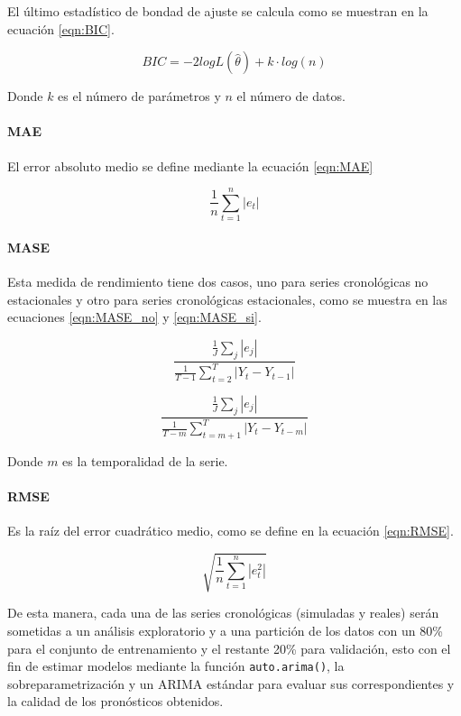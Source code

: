 \documentclass[
]{article}
\begin{document}
El último estadístico de bondad de ajuste se calcula como se muestran en
la ecuación \ref{eqn:BIC}.

\begin{equation}
\label{eqn:BIC}
BIC=-2logL\left(\hat\theta\right)+k\cdot log(n)
\end{equation}

Donde \(k\) es el número de parámetros y \(n\) el número de datos.

\paragraph{MAE}

El error absoluto medio se define mediante la ecuación \ref{eqn:MAE}

\begin{equation}
\label{eqn:MAE}
\frac{1}{n}\sum_{t=1}^n |e_t|
\end{equation}

\paragraph{MASE}

Esta medida de rendimiento tiene dos casos, uno para series cronológicas
no estacionales y otro para series cronológicas estacionales, como se
muestra en las ecuaciones \ref{eqn:MASE_no} y \ref{eqn:MASE_si}.

\begin{equation}
\label{eqn:MASE_no}
\frac{\frac{1}{J}\sum_j|e_j|}{\frac{1}{T-1}\sum_{t=2}^T|Y_t-Y_{t-1}|}
\end{equation}

\begin{equation}
\label{eqn:MASE_si}
\frac{\frac{1}{J}\sum_j|e_j|}{\frac{1}{T-m}\sum_{t=m+1}^T|Y_t-Y_{t-m}|}
\end{equation}

Donde \(m\) es la temporalidad de la serie.

\paragraph{RMSE}

Es la raíz del error cuadrático medio, como se define en la ecuación
\ref{eqn:RMSE}.

\begin{equation}
\label{eqn:RMSE}
\sqrt{\frac{1}{n}\sum_{t=1}^n |e_t^2|}
\end{equation}

De esta manera, cada una de las series cronológicas (simuladas y reales)
serán sometidas a un análisis exploratorio y a una partición de los
datos con un 80\% para el conjunto de entrenamiento y el restante 20\%
para validación, esto con el fin de estimar modelos mediante la función
\texttt{auto.arima()}, la sobreparametrización y un ARIMA estándar para
evaluar sus correspondientes y la calidad de los pronósticos obtenidos.
\end{document}
